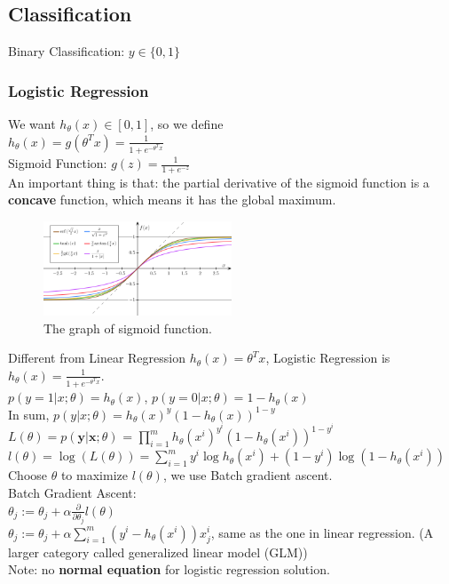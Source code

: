 \documentclass{article}
\begin{document}
\subsection{Classification}
Binary Classification: $y \in \{0,1\}$
\subsubsection{Logistic Regression}
We want $h_\theta(x) \in [0, 1]$, so we define\\
$h_\theta(x) = g(\theta^Tx) = \frac{1}{1 + e^{-\theta^Tx}}$\\
Sigmoid Function: $g(z) = \frac{1}{1 + e^{-z}}$\\
An important thing is that: the partial derivative of the sigmoid function is a \textbf{concave} function, which means it has the global maximum.
\begin{figure}[H]
	\centerline{
   \includegraphics[width=0.5\textwidth]{Fig1.png}}
   \caption{The graph of sigmoid function.}
   \label{fig:example}
\end{figure}
\noindent
Different from Linear Regression $h_\theta(x) = \theta^Tx$, Logistic Regression is $h_\theta(x) = \frac{1}{1 + e^{-\theta^Tx}}$.\\
$p(y=1|x;\theta)=h_\theta(x)$, 
$p(y=0|x;\theta)=1-h_\theta(x)$\\
In sum, $p(y|x;\theta)=h_\theta(x)^y(1-h_\theta(x))^{1-y}$\\

\noindent
$L(\theta) = p(\boldsymbol{y}|\boldsymbol{x};\theta)$ = $\prod\limits_{i=1}^m h_\theta(x^i)^{y^i}(1-h_\theta(x^i))^{1-y^i}$\\
$l(\theta) = \log{(L(\theta))} = \sum\limits_{i=1}^m y^i\log{h_\theta(x^i)} + (1-y^i)\log{(1-h_\theta(x^i))}$\\
Choose $\theta$ to maximize $l(\theta)$, we use Batch gradient ascent.\\

\noindent
Batch Gradient Ascent:\\
\indent
$\theta_j := \theta_j + \alpha\frac{\partial}{\partial\theta_j}l(\theta)$\\
$\theta_j := \theta_j + \alpha\sum\limits_{i=1}^m(y^i-h_\theta(x^i))x_j^i$, same as the one in linear regression. (A larger category called generalized linear model (GLM))\\
Note: no \textbf{normal equation} for logistic regression solution.\\
\end{document}

